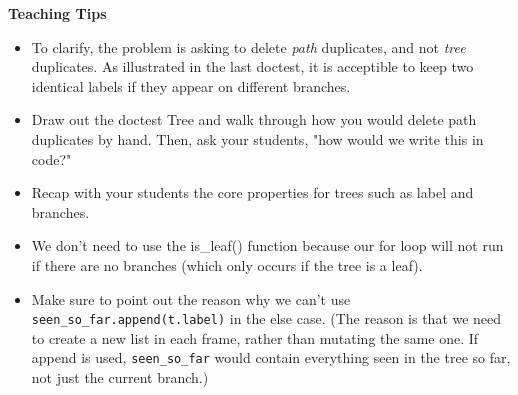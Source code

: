 \begin{guide}
    \textbf{Teaching Tips}
    \begin{itemize}
       \item To clarify, the problem is asking to delete \textit{path} duplicates, and not \textit{tree} duplicates.
       As illustrated in the last doctest, it is acceptible to keep two identical labels if they appear on different branches. 
       \item Draw out the doctest Tree and walk through how you would delete path duplicates by hand. Then, ask your students, "how would we write this in code?"
       \item Recap with your students the core properties for trees such as label and branches.
       \item We don't need to use the is\_leaf() function because our for loop will not run if there are no branches (which only occurs if the tree is a leaf).
       \item Make sure to point out the reason why we can't use \texttt{seen\_so\_far.append(t.label)} in the else case. 
       (The reason is that we need to create a new list in each frame, rather than mutating the same one. If append is used,
       \texttt{seen\_so\_far} would contain everything seen in the tree so far, not just the current branch.)
    \end{itemize}
 \end{guide}

